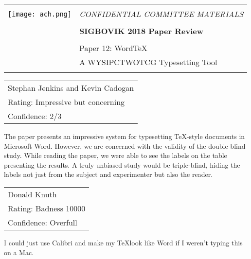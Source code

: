 \documentclass[12pt]{article}
\begin{document}
{\sffamily
\begin{tabular}{ll}
\multirow{3}{*}{\texttt{[image: ach.png]}}\\
& \Large{\em CONFIDENTIAL COMMITTEE MATERIALS} \\
&\\
& \textbf{\Huge{SIGBOVIK 2018 Paper Review}} \\
&\\
& \LARGE{Paper 12: Word\TeX} \\[0.25em]
& \LARGE{A WYSIPCTWOTCG Typesetting Tool} \\
&\\
\hline
\end{tabular}}
\vspace{2em}
\thispagestyle{empty}

{\large\bf
\begin{tabular}{l}
Stephan Jenkins and Kevin Cadogan \\
Rating: Impressive but concerning \\
Confidence: 2/3 \\
\end{tabular}}
\vspace{1em}

The paper presents an impressive system for typesetting \TeX-style documents in Microsoft Word.
However, we are concerned with the validity of the double-blind study.
While reading the paper, we were able to see the labels on the table presenting the results.
A truly unbiased study would be triple-blind, hiding the labels not just from the subject and experimenter but also the reader.


\vspace{2em}
{\large\bf
\begin{tabular}{l}
Donald Knuth \\
Rating: Badness 10000 \\
Confidence: Overfull \\
\end{tabular}}
\vspace{1em}

I could just use Calibri and make my \TeX look like Word if I weren't typing this on a Mac.
\end{document}

